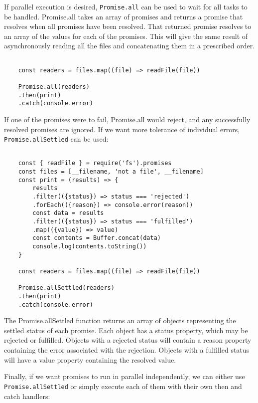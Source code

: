 \documentclass{scrartcl}
\begin{document}
If parallel execution is desired, \lstinline|Promise.all| can be used to wait for all tasks to be handled. Promise.all takes an array of promises and returns a promise that resolves when all promises have been resolved. That returned promise resolves to an array of the values for each of the promises. This will give the same result of asynchronously reading all the files and concatenating them in a prescribed order.

\begin{lstlisting}[style=ES6]

    const readers = files.map((file) => readFile(file))

    Promise.all(readers)
    .then(print)
    .catch(console.error)

\end{lstlisting}

If one of the promises were to fail, Promise.all would reject, and any successfully resolved promises are ignored. If we want more tolerance of individual errors, \lstinline|Promise.allSettled| can be used:

\begin{lstlisting}[style=ES6]

    const { readFile } = require('fs').promises
    const files = [__filename, 'not a file', __filename]
    const print = (results) => {
        results
        .filter(({status}) => status === 'rejected')
        .forEach(({reason}) => console.error(reason))
        const data = results
        .filter(({status}) => status === 'fulfilled')
        .map(({value}) => value)
        const contents = Buffer.concat(data)
        console.log(contents.toString())
    }

    const readers = files.map((file) => readFile(file))

    Promise.allSettled(readers)
    .then(print)
    .catch(console.error)

\end{lstlisting}

The Promise.allSettled function returns an array of objects representing the settled status of each promise. Each object has a status property, which may be rejected or fulfilled. Objects with a rejected status will contain a reason property containing the error associated with the rejection. Objects with a fulfilled status will have a value property containing the resolved value.

Finally, if we want promises to run in parallel independently, we can either use \lstinline|Promise.allSettled| or simply execute each of them with their own then and catch handlers:
\end{document}
